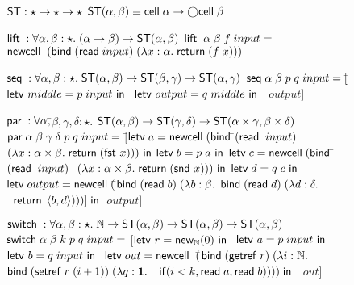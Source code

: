 \documentclass[natbib]{sigplanconf}
\begin{document}
\begin{figure}
{\small
\begin{specification}
$\mbox{\textsf{{ST}}} : \star \to \star \to \star$ \nextline
$\mbox{\textsf{{ST}}}({\alpha}, {\beta}) \equiv \mbox{\textsf{{cell}}}\;{\alpha} \to \bigcirc{\mbox{\textsf{{cell}}}\;{\beta}}$ 

$\mbox{\textsf{{lift}}}\; : \forall \alpha, \beta:\star.\; (\alpha \to \beta) \to \mbox{\textsf{{ST}}}({\alpha}, {\beta})$ \nextline
$\mbox{\textsf{{lift}}}\;\;\alpha\;\beta\;f\;input = $ \nextline
\;\; $\mbox{\textsf{{newcell}}}\; \;(\mbox{\textsf{{bind}}}\; (\mbox{\textsf{{read}}}\; input)\; (\lambda x:\alpha.\;\mbox{\textsf{{return}}}\; (f\;x)))$ 

$\mbox{\textsf{{seq}}}\; : \forall \alpha, \beta:\star.\; \mbox{\textsf{{ST}}}({\alpha}, {\beta}) \to \mbox{\textsf{{ST}}}({\beta}, {\gamma}) \to \mbox{\textsf{{ST}}}({\alpha}, {\gamma})$ \nextline
$\mbox{\textsf{{seq}}}\; \alpha\;\beta\;p\;q\;input = [$\=$\letv{middle}{p\;input}$ \nextline
                            \>$\letv{output}{q\;middle}$ \nextline 
                            \>$\;output]$ 

$\mbox{\textsf{{par}}}\; : \forall \alpha,$\=$\beta, \gamma, \delta:\star.$ \nextline
   \>$\mbox{\textsf{{ST}}}({\alpha}, {\beta}) \to \mbox{\textsf{{ST}}}({\gamma}, {\delta}) \to \mbox{\textsf{{ST}}}({\alpha \times \gamma}, {\beta \times \delta})$ \nextline
$\mbox{\textsf{{par}}}\; \alpha\;\beta\;\gamma\;\delta\; p \; q \; input = $ \nextline
\;\;$[$\=$\mbox{\textsf{{letv}}}\;a = \mbox{\textsf{{newcell}}}\; (\mbox{\textsf{{bind}}}\;$\=$(\mbox{\textsf{{read}}}\;\;input)$ \nextline
     \>                                   \>$(\lambda x:\alpha\times \beta.\;\mbox{\textsf{{return}}}\; (\mbox{\textsf{{fst }}} x))) \mbox{\textsf{{ in}}}$ \nextline
     \>$\mbox{\textsf{{letv}}}\;b = {p\;a} \mbox{\textsf{{ in}}}$ \nextline
     \>$\mbox{\textsf{{letv}}}\;c = \mbox{\textsf{{newcell}}}\; (\mbox{\textsf{{bind}}}\;$\=$(\mbox{\textsf{{read}}}\;\;input)\;$\nextline 
     \>                                   \>$(\lambda x:\alpha\times \beta.\;\mbox{\textsf{{return}}}\; (\mbox{\textsf{{snd }}} x))) \mbox{\textsf{{ in}}}$ \nextline
     \>$\mbox{\textsf{{letv}}}\;d = {q\;c} \mbox{\textsf{{ in}}} $ \nextline
     \>$\mbox{\textsf{{letv}}}\;output = \mbox{\textsf{{newcell}}}\; ($\=$\mbox{\textsf{{bind}}}\; (\mbox{\textsf{{read}}}\; b)\; (\lambda b:\beta.$ \nextline
     \>                                   \>$\mbox{\textsf{{bind}}}\; (\mbox{\textsf{{read}}}\; d)\; (\lambda d:\delta.$ \nextline
     \>                                   \>$\;\;\mbox{\textsf{{return}}}\; \left<{b},{d}\right>)))] \;\mbox{\textsf{{in}}}$ \nextline
     \>$\;output]$ 

$\mbox{\textsf{{switch}}}\; : \forall \alpha, \beta:\star.\; \mathbb{N} \to \mbox{\textsf{{ST}}}({\alpha}, {\beta}) \to \mbox{\textsf{{ST}}}({\alpha}, {\beta}) \to \mbox{\textsf{{ST}}}({\alpha}, {\beta})$ \nextline
$\mbox{\textsf{{switch}}}\; \alpha\;\beta\;k\;p\;q\; input =  $ \nextline
\;\;$[$\=$\mbox{\textsf{{letv }}}r = \mbox{\textsf{{new}}}_{\mathbb{N}}(0)\mbox{\textsf{{ in }}}$ \nextline
    \>$\letv{a}{p\;input}$ \nextline
    \>$\letv{b}{q\;input}$ \nextline
    \>$\mbox{\textsf{{letv}}}\; out = \mbox{\textsf{{newcell}}}\;\; ($\=$\mbox{\textsf{{bind}}}\; (\mbox{\textsf{{getref}}}\; r) \;(\lambda i:\mathbb{N}.\;$ \nextline
    \>                                 \>$\mbox{\textsf{{bind}}}\; (\mbox{\textsf{{setref}}}\; r\;(i+1)) \; (\lambda q:\mathbf{1}.$ \nextline
    \>                                 \>$\;\;\mbox{\textsf{{if}}}(i < k, \mbox{\textsf{{read}}}\; a, \mbox{\textsf{{read}}}\; b)))) \;\mbox{\textsf{{in}}}$ \nextline
    \>$\;\;out]$


\end{specification}}
\end{figure}
\end{document}
